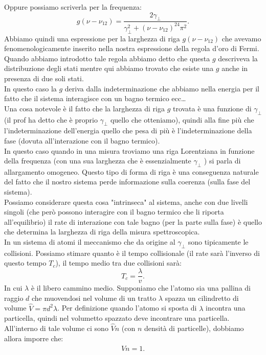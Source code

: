 Oppure possiamo scriverla per la frequenza:
\[
    g(\nu-\nu_{12}) = 
    \frac{2\gamma_\perp}
    {\gamma_\perp^2+\left(\nu-\nu_{12}\right)^24\pi^2}
.\] 
Abbiamo quindi una espressione per la larghezza di riga $g(\nu-\nu_{12})$ che avevamo fenomenologicamente inserito nella nostra espressione della regola d'oro di Fermi. Quando abbiamo introdotto tale regola abbiamo detto che questa $g$ descriveva la distribuzione degli stati mentre qui abbiamo trovato che esiste una $g$ anche in presenza di due soli stati.\\
In questo caso la $g$ deriva dalla indeterminazione che abbiamo nella energia per il fatto che il sistema interagisce con un bagno termico ecc\ldots\\
Una cosa notevole è il fatto che la larghezza di riga $g$ trovata è una funzione di $\gamma_\perp$ (il prof ha detto che è proprio $\gamma_\perp$ quello che otteniamo), quindi alla fine più che l'indeterminazione dell'energia quello che pesa di più è l'indeterminazione della fase (dovuta all'interazione con il bagno termico).\\
In questo caso quando in una misura troviamo una riga Lorentziana in funzione della frequenza (con una sua larghezza che è essenzialmente $\gamma_\perp$ ) si parla di allargamento omogeneo.
Questo tipo di forma di riga è una conseguenza naturale del fatto che il nostro sistema perde informazione sulla coerenza (sulla fase del sistema). \\
Possiamo considerare questa cosa "intrinseca" al sistema, anche con due livelli singoli (che però possono interagire con il bagno termico che li riporta all'equilibrio) il rate di interazione con tale bagno (per la parte sulla fase) è quello che determina la larghezza di riga della misura spettroscopica.\\
In un sistema di atomi il meccanismo che da origine al $\gamma_\perp$ sono tipicamente le collisioni. Possiamo stimare quanto è il tempo collisionale (il rate sarà l'inverso di questo tempo $T_c$), il tempo medio tra due collisioni sarà:
\[
    T_c = \frac{\lambda}{v}
.\] 
In cui $\lambda$ è il libero cammino medio. Supponiamo che l'atomo sia una pallina di raggio $d$ che muovendosi nel volume di un tratto $\lambda$ spazza un cilindretto di volume $\hat{V} = \pi d^2\lambda$. Per definizione quando l'atomo si sposta di $\lambda$ incontra una particella, quindi nel volumetto spazzato deve incontrare una particella. All'interno di tale volume ci sono $\hat{V}n$ (con $n$ densità di particelle), dobbiamo allora imporre che:
\[
    \hat{V}n = 1
.\] 
